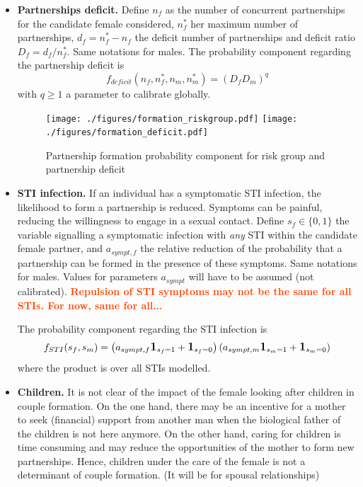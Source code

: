 \documentclass[11pt, onecolumn]{article}
\newcommand{\one}[1]{\textbf{\large{1}}_{#1}}
\newcommand{\warning}[1]{\textbf{\textcolor{OrangeRed}{#1}}}
\begin{document}
\begin{itemize}
\item \textbf{Partnerships deficit.} Define $n_f$ as the number of concurrent partnerships for the candidate female considered, $n^*_f$ her maximum number of partnerships, $d_f=n^*_f-n_f$ the deficit number of partnerships and deficit ratio $D_f=d_f/n^*_f$. Same notations for males. The probability component regarding the partnership deficit is
$$ f_{deficit}(n_f,n^*_f,n_m,n^*_m) = (D_f D_m)^q$$
with $q\geq 1$ a parameter to calibrate globally.

\begin{figure}[ht]
\centering
    \texttt{[image: ./figures/formation\_riskgroup.pdf]}
    \texttt{[image: ./figures/formation\_deficit.pdf]}
\caption{Partnership formation probability component for risk group and partnership deficit}
\label{fig:formationRiskDeficit}
\end{figure}

\item \textbf{STI infection.} If an individual has a symptomatic STI infection, the likelihood to form a partnership is reduced. Symptoms can be painful, reducing the willingness to engage in a sexual contact. Define $s_f\in\{0,1\}$ the variable signalling a symptomatic infection with \emph{any} STI within the candidate female partner, and $a_{sympt,f}$ the relative reduction of the probability that a partnership can be formed in the presence of these symptoms. Same notations for males. Values for parameters $a_{sympt}$ will have to be assumed (not calibrated). \warning{Repulsion of STI symptoms may not be the same for all STIs. For now, same for all...}

The probability component regarding the STI infection is
$$ f_{STI}(s_f,s_m)= \left(a_{sympt,f} \one{s_f=1} +\one{s_f=0}\right) \left(a_{sympt,m} \one{s_m=1} +\one{s_m=0}\right)$$
where the product is over all STIs modelled.


\item \textbf{Children.} It is not clear of the impact of the female looking after children in couple formation. On the one hand, there may be an incentive for a mother to seek (financial) support from another man when the biological father of the children is not here anymore. On the other hand, caring for children is time consuming and may reduce the opportunities of the mother to form new partnerships. Hence, children under the care of the female is not a determinant of couple formation. (It will be for spousal relationships)

\end{itemize}
\end{document}
